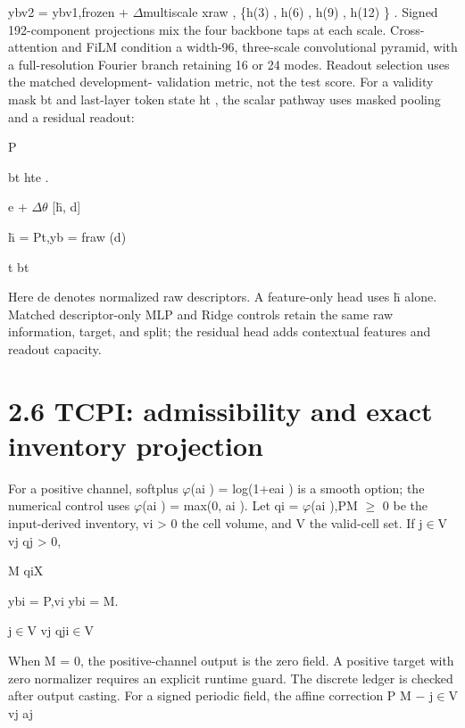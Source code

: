 \documentclass[11pt]{article}
\begin{document}
ybv2 = ybv1,frozen + \ensuremath{\Delta}multiscale xraw , \{h(3) , h(6) , h(9) , h(12) \} .
Signed 192-component projections mix the four backbone taps at each scale. Cross-attention
and FiLM condition a width-96, three-scale convolutional pyramid, with a full-resolution
Fourier branch retaining 16 or 24 modes. Readout selection uses the matched development-
validation metric, not the test score.
For a validity mask bt and last-layer token state ht , the scalar pathway uses masked pooling
and a residual readout:

\noindent P\quad [U+0010]\quad [U+0011]\par


\noindent bt ht\quad e .\par

e + \ensuremath{\Delta}\ensuremath{\theta} [h̄, d]

\noindent h̄ = Pt\quad ,\quad yb = fraw (d)\par

t bt

Here de denotes normalized raw descriptors. A feature-only head uses h̄ alone. Matched
descriptor-only MLP and Ridge controls retain the same raw information, target, and split;
the residual head adds contextual features and readout capacity.

\section*{2.6 TCPI: admissibility and exact inventory projection}

For a positive channel, softplus \ensuremath{\varphi}(ai ) = log(1+eai ) is a smooth option; the numerical control
uses \ensuremath{\varphi}(ai ) = max(0, ai ). Let qi = \ensuremath{\varphi}(ai ),PM \ensuremath{\geq} 0 be the input-derived inventory, vi > 0 the
cell volume, and V the valid-cell set. If j\ensuremath{\in}V vj qj > 0,

\noindent M qi\quad X\par


\noindent ybi = P\quad ,\quad vi ybi = M.\par


\noindent j\ensuremath{\in}V vj qj\quad i\ensuremath{\in}V\par


When M = 0, the positive-channel output is the zero field. A positive target with zero
normalizer requires an explicit runtime guard. The discrete ledger is checked after output
casting. For a signed periodic field, the affine correction
P
M \ensuremath{-} j\ensuremath{\in}V vj aj
\end{document}
